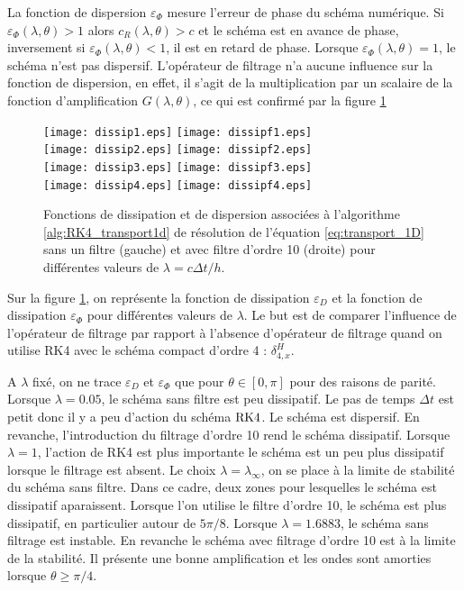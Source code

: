 La fonction de dispersion $\varepsilon_{\Phi}$ mesure l'erreur de phase du schéma numérique. Si $\varepsilon_{\Phi}(\lambda, \theta) > 1$ alors $c_R(\lambda,\theta) > c$ et le schéma est en avance de phase, inversement si $\varepsilon_{\Phi}(\lambda, \theta) < 1$, il est en retard de phase. Lorsque $\varepsilon_{\Phi}(\lambda, \theta) = 1$, le schéma n'est pas dispersif.
L'opérateur de filtrage n'a aucune influence sur la fonction de dispersion, en effet, il s'agit de la multiplication par un scalaire de la fonction d'amplification $G(\lambda,\theta)$, ce qui est confirmé par la figure \ref{fig:dissip_disper}

\begin{figure}[htbp]
\begin{center}
\texttt{[image: dissip1.eps]}
\texttt{[image: dissipf1.eps]}\\
\texttt{[image: dissip2.eps]}
\texttt{[image: dissipf2.eps]}\\
\texttt{[image: dissip3.eps]}
\texttt{[image: dissipf3.eps]}\\
\texttt{[image: dissip4.eps]}
\texttt{[image: dissipf4.eps]}
\end{center}
\caption{Fonctions de dissipation et de dispersion associées à l'algorithme \ref{alg:RK4_transport1d} de résolution de l'équation \eqref{eq:transport_1D} sans un filtre (gauche) et avec filtre d'ordre 10 (droite) pour différentes valeurs de $\lambda = c \Delta t / h$.}
\label{fig:dissip_disper}
\end{figure}

Sur la figure \ref{fig:dissip_disper}, on représente la fonction de dissipation $\varepsilon_D$ et la fonction de dissipation $\varepsilon_{\Phi}$ pour différentes valeurs de $\lambda$. Le but est de comparer l'influence de l'opérateur de filtrage par rapport à l'absence d'opérateur de filtrage quand on utilise RK4 avec le schéma compact d'ordre 4 : $\delta_{4,x}^H$.

A $\lambda$ fixé, on ne trace $\varepsilon_D$ et $\varepsilon_{\Phi}$ que pour $\theta \in [0, \pi]$ pour des raisons de parité. Lorsque $\lambda=0.05$, le schéma sans filtre est peu dissipatif. Le pas de temps $\Delta t$ est petit donc il y a peu d'action du schéma $\RK4$. Le schéma est dispersif. En revanche, l'introduction du filtrage d'ordre 10 rend le schéma dissipatif. Lorsque $\lambda =1$, l'action de RK4 est plus importante le schéma est un peu plus dissipatif lorsque le filtrage est absent.
Le choix $\lambda = \lambda_{\infty}$, on se place à la limite de stabilité du schéma sans filtre. Dans ce cadre, deux zones pour lesquelles le schéma est dissipatif aparaissent. Lorsque l'on utilise le filtre d'ordre 10, le schéma est plus dissipatif, en particulier autour de $5 \pi/8$.
Lorsque $\lambda = 1.6883$, le schéma sans filtrage est instable. En revanche le schéma avec filtrage d'ordre 10 est à la limite de la stabilité. Il présente une bonne amplification et les ondes sont amorties lorsque $\theta \geq \pi/4$.







